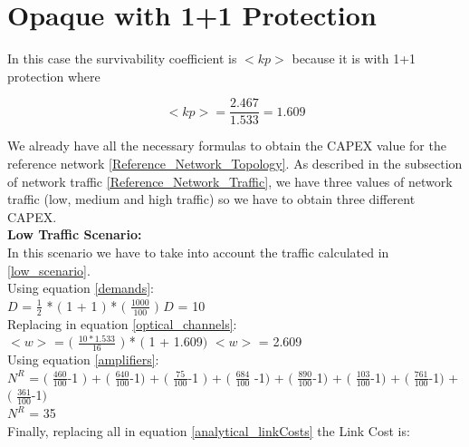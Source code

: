 \clearpage

\section{Opaque with 1+1 Protection}\label{analytical_Opaque_Protection}

In this case the survivability coefficient is $<kp>$ because it is with 1+1 protection where

\begin{equation*}
<kp> = \frac{2.467}{1.533} = 1.609
\end{equation*}

We already have all the necessary formulas to obtain the CAPEX value for the reference network \ref{Reference_Network_Topology}. As described in the subsection of network traffic \ref{Reference_Network_Traffic}, we have three values of network traffic (low, medium and high traffic) so we have to obtain three different CAPEX.\\

\textbf{Low Traffic Scenario:}\\

In this scenario we have to take into account the traffic calculated in \ref{low_scenario}.\\

Using equation \ref{demands}:\\

$D$ = $\frac{1}{2}$ * $($ 1 + 1 $)$ * $($ $\frac{1000}{100}$ $)$ \qquad \qquad $D$ = 10\\

Replacing in equation \ref{optical_channels}:\\

$<w>$ = $($ $\frac{10 * 1.533}{16}$ $)$ * $($ 1 + 1.609$)$ \qquad \qquad $<w>$ = 2.609\\

Using equation \ref{amplifiers}:\\

$N^R$ = $($ $\frac{460}{100}$-1 $)$ + $($ $\frac{640}{100}$-1$)$ + $($ $\frac{75}{100}$-1 $)$ + $($ $\frac{684}{100}$ -1$)$ + $($ $\frac{890}{100}$-1$)$ + $($ $\frac{103}{100}$-1$)$ + $($ $\frac{761}{100}$-1$)$ + $($ $\frac{361}{100}$-1$)$\\

$N^R$ = 35\\

Finally, replacing all in equation \ref{analytical_linkCosts} the Link Cost is:\\

